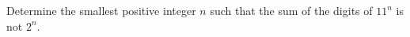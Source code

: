 Determine the smallest positive integer $n$ such that the sum of the digits of $11^n$ is not $2^n$.
